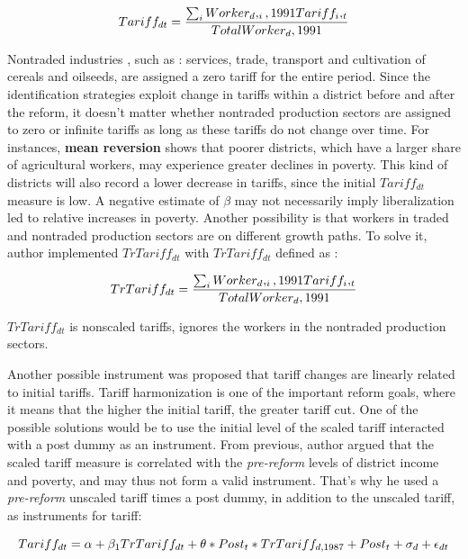 \documentclass[a4paper,12pt]{article}
\begin{document}
\begin{equation}
\centering
Tariff_{dt} = \frac{{\sum_i Worker_d,_i,1991} Tariff_i,_t}{Total Worker_d,1991}
\end{equation}

Nontraded industries , such as : services, trade, transport and cultivation of cereals and oilseeds, are assigned a zero tariff for the entire period. Since the identification strategies exploit change in tariffs within a district before and after the reform, it doesn't matter whether nontraded production sectors are assigned to zero or infinite tariffs as long as these tariffs do not change over time. For instances, \textbf{mean reversion} shows that poorer districts, which have a larger share of agricultural workers, may experience greater declines in poverty. This kind of districts will also record a lower decrease in tariffs, since the initial $Tariff_{dt}$ measure is low. A negative estimate of $\beta$ may not necessarily imply liberalization led to relative increases in poverty. Another possibility is that workers in traded and nontraded production sectors are on different growth paths. To solve it, author implemented $TrTariff_{dt}$ with $TrTariff_{dt}$ defined as : 

\begin{equation}
\centering
TrTariff_{dt} = \frac{{\sum_i Worker_d,_i,1991} Tariff_i,_t}{Total Worker_d,1991}
\end{equation}

$TrTariff_{dt}$ is nonscaled tariffs, ignores the workers in the nontraded production sectors. 


Another possible instrument was proposed that tariff changes are linearly related to initial tariffs. Tariff harmonization is one of the important reform goals, where it means that the higher the initial tariff, the greater tariff cut. One of the possible solutions would be to use the initial level of the scaled tariff interacted with a post dummy as an instrument. From previous, author argued that the scaled tariff measure is correlated with the \textit{pre-reform} levels of district income and poverty, and may thus not form a valid instrument. That's why he used a \textit{pre-reform} unscaled  tariff times a post dummy, in addition to the unscaled tariff, as instruments for tariff: 

\begin{equation}
\centering
Tariff_{dt} = \alpha + \beta_1 TrTariff_{dt} + \theta * Post_t * TrTariff_{d,1987} + Post_t + \sigma_d + \epsilon_{dt}
\end{equation}
\end{document}
